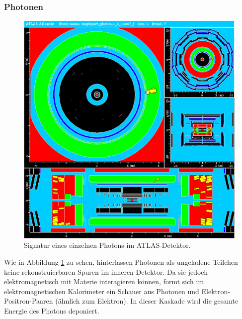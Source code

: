 \documentclass[11pt, a4paper]{article}
\numberwithin{equation}{section}
\begin{document}
\clearpage
\subsubsection{Photonen}
\begin{figure}[htbp]
	\centering
	\includegraphics[width=1.0\textwidth]{./data/atlantis/singlepart_events_new/photons/single_photon_2.png}
	\caption{Signatur eines einzelnen Photons im ATLAS-Detektor.}
	\label{fig:photon}
\end{figure}
\vfill
\noindent
Wie in Abbildung \ref{fig:photon} zu sehen, hinterlassen Photonen als ungeladene Teilchen keine rekonstruierbaren Spuren im inneren Detektor.
Da sie jedoch elektromagnetisch mit Materie interagieren können, formt sich im elektromagnetischen Kalorimeter ein Schauer aus Photonen und Elektron-Positron-Paaren (ähnlich zum Elektron).
In dieser Kaskade wird die gesamte Energie des Photons deponiert.
\vfill
\end{document}

